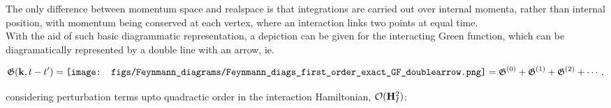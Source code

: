 The only difference between momentum space and realspace is that integrations are carried out over internal momenta, rather than internal position, with momentum being conserved at each vertex, where an interaction links two points at equal time. \\

With the aid of such basic diagrammatic representation, a depiction can be given for the interacting Green function, which can be diagramatically represented by a double line with an arrow, ie. 

\begin{equation}
    \mathfrak{G}({\bf k}, t-t') = \texttt{[image: figs/Feynmann\_diagrams/Feynmann\_diags\_first\_order\_exact\_GF\_doublearrow.png]} = \mathfrak{G}^{(0)} + \mathfrak{G}^{(1)} + \mathfrak{G}^{(2)} + \cdots,
\end{equation}

considering perturbation terms upto quadractic order in the interaction Hamiltonian, $\mathcal{O}({\bf H}_I^2)$:

